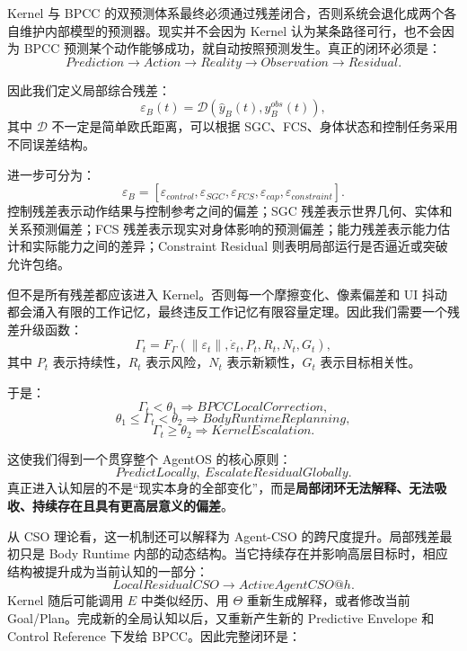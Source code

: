 Kernel 与 BPCC 的双预测体系最终必须通过残差闭合，否则系统会退化成两个各自维护内部模型的预测器。现实并不会因为 Kernel 认为某条路径可行，也不会因为 BPCC 预测某个动作能够成功，就自动按照预测发生。真正的闭环必须是：
\[
Prediction
\rightarrow
Action
\rightarrow
Reality
\rightarrow
Observation
\rightarrow
Residual.
\]

因此我们定义局部综合残差：
\[
\varepsilon_B(t)
=
\mathcal D
\left(
\hat y_B(t),
y_B^{obs}(t)
\right),
\]
其中 $\mathcal D$ 不一定是简单欧氏距离，可以根据 SGC、FCS、身体状态和控制任务采用不同误差结构。

进一步可分为：
\[
\varepsilon_B
=
\left[
\varepsilon_{control},
\varepsilon_{SGC},
\varepsilon_{FCS},
\varepsilon_{cap},
\varepsilon_{constraint}
\right].
\]
控制残差表示动作结果与控制参考之间的偏差；SGC 残差表示世界几何、实体和关系预测偏差；FCS 残差表示现实对身体影响的预测偏差；能力残差表示能力估计和实际能力之间的差异；Constraint Residual 则表明局部运行是否逼近或突破允许包络。

但不是所有残差都应该进入 Kernel。否则每一个摩擦变化、像素偏差和 UI 抖动都会涌入有限的工作记忆，最终违反工作记忆有限容量定理。因此我们需要一个残差升级函数：
\[
\Gamma_t
=
F_\Gamma
\left(
\|\varepsilon_t\|,
\dot\varepsilon_t,
P_t,
R_t,
N_t,
G_t
\right),
\]
其中 $P_t$ 表示持续性，$R_t$ 表示风险，$N_t$ 表示新颖性，$G_t$ 表示目标相关性。

于是：
\[
\Gamma_t<\theta_1
\Rightarrow
BPCCLocalCorrection,
\]
\[
\theta_1\leq\Gamma_t<\theta_2
\Rightarrow
BodyRuntimeReplanning,
\]
\[
\Gamma_t\geq\theta_2
\Rightarrow
KernelEscalation.
\]

这使我们得到一个贯穿整个 AgentOS 的核心原则：
\[
\boxed{
PredictLocally,\ EscalateResidualGlobally.
}
\]
真正进入认知层的不是“现实本身的全部变化”，而是\textbf{局部闭环无法解释、无法吸收、持续存在且具有更高层意义的偏差}。

从 CSO 理论看，这一机制还可以解释为 Agent-CSO 的跨尺度提升。局部残差最初只是 Body Runtime 内部的动态结构。当它持续存在并影响高层目标时，相应结构被提升成为当前认知的一部分：
\[
LocalResidualCSO
\rightarrow
ActiveAgentCSO@h.
\]
Kernel 随后可能调用 $E$ 中类似经历、用 $\Theta$ 重新生成解释，或者修改当前 Goal/Plan。完成新的全局认知以后，又重新产生新的 Predictive Envelope 和 Control Reference 下发给 BPCC。因此完整闭环是：
\begin{statementbox}
\centering
{}
\end{statementbox}

